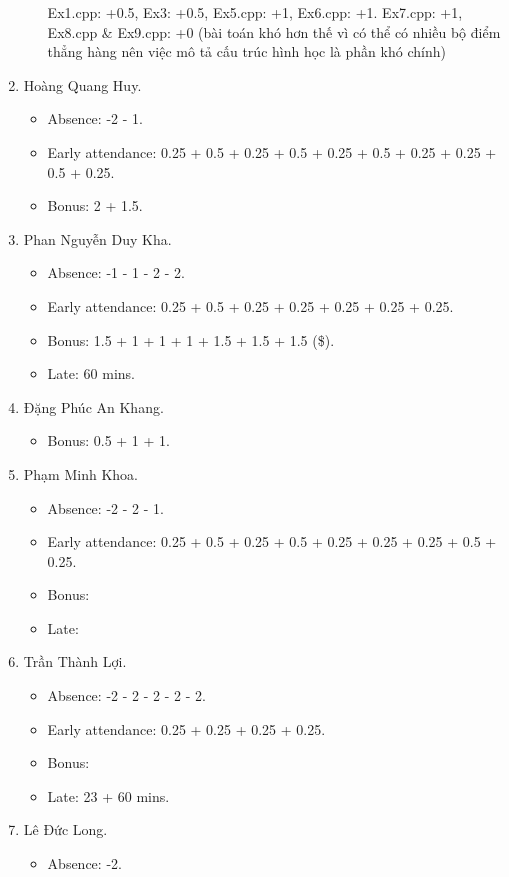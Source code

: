 \documentclass{article}
\begin{document}
\begin{enumerate}
\begin{itemize}
		Ex1.cpp: +0.5, Ex3: +0.5, Ex5.cpp: +1, Ex6.cpp: +1. Ex7.cpp: +1, Ex8.cpp \& Ex9.cpp: +0 (bài toán khó hơn thế vì có thể có nhiều bộ điểm thẳng hàng nên việc mô tả cấu trúc hình học là phần khó chính)
	\end{itemize}
	\item {\sc Hoàng Quang Huy.}
	\begin{itemize}
		\item Absence: -2 - 1.
		\item Early attendance: 0.25 + 0.5 + 0.25 + 0.5 + 0.25 + 0.5 + 0.25 + 0.25 + 0.5 + 0.25.
		\item Bonus: 2 + 1.5.
	\end{itemize}
	\item {\sc Phan Nguyễn Duy Kha.}
	\begin{itemize}
		\item Absence: -1 - 1 - 2 - 2.
		\item Early attendance: 0.25 + 0.5 + 0.25 + 0.25 + 0.25 + 0.25 + 0.25.
		\item Bonus: 1.5 + 1 + 1 + 1 + 1.5 + 1.5 + 1.5 (\$).
		\item Late: 60 mins.
	\end{itemize}
	\item {\sc Đặng Phúc An Khang.}
	\begin{itemize}
		\item Bonus: 0.5 + 1 + 1.
	\end{itemize}
	\item {\sc Phạm Minh Khoa.}
	\begin{itemize}
		\item Absence: -2 - 2 - 1.
		\item Early attendance: 0.25 + 0.5 + 0.25 + 0.5 + 0.25 + 0.25 + 0.25 + 0.5 + 0.25.
		\item Bonus:
		\item Late: 
	\end{itemize}
	\item {\sc Trần Thành Lợi.}
	\begin{itemize}
		\item Absence: -2 - 2 - 2 - 2 - 2.
		\item Early attendance: 0.25 + 0.25 + 0.25 + 0.25.
		\item Bonus: 
		\item Late: 23 + 60 mins.
	\end{itemize}
	\item {\sc Lê Đức Long.}
	\begin{itemize}
		\item Absence: -2.

\end{itemize}
\end{enumerate}
\end{document}
